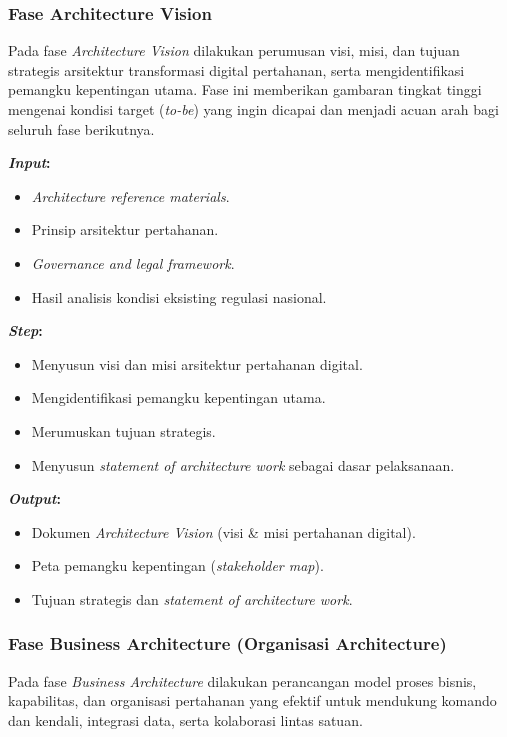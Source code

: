 \subsubsection{Fase Architecture Vision}
Pada fase \textit{Architecture Vision} dilakukan perumusan visi, misi, dan tujuan strategis arsitektur transformasi digital pertahanan, serta mengidentifikasi pemangku kepentingan utama.
Fase ini memberikan gambaran tingkat tinggi mengenai kondisi target (\textit{to-be}) yang ingin dicapai dan menjadi acuan arah bagi seluruh fase berikutnya.

\textbf{\textit{Input}:}
\begin{itemize}
  \item \textit{Architecture reference materials}.
  \item Prinsip arsitektur pertahanan.
  \item \textit{Governance and legal framework}.
  \item Hasil analisis kondisi eksisting regulasi nasional.
\end{itemize}
\textbf{\textit{Step}:}
\begin{itemize}
  \item Menyusun visi dan misi arsitektur pertahanan digital.
  \item Mengidentifikasi pemangku kepentingan utama.
  \item Merumuskan tujuan strategis.
  \item Menyusun \textit{statement of architecture work} sebagai dasar pelaksanaan.
\end{itemize}
\textbf{\textit{Output}:}
\begin{itemize}
  \item Dokumen \textit{Architecture Vision} (visi \& misi pertahanan digital).
  \item Peta pemangku kepentingan (\textit{stakeholder map}).
  \item Tujuan strategis dan \textit{statement of architecture work}.
\end{itemize}

\subsubsection{Fase Business Architecture (Organisasi Architecture)}
Pada fase \textit{Business Architecture} dilakukan perancangan model proses bisnis, kapabilitas, dan organisasi pertahanan yang efektif untuk mendukung komando dan kendali, integrasi data, serta kolaborasi lintas satuan.

